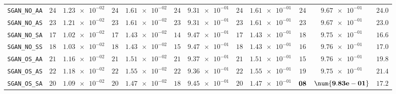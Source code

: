 \begin{xltabular}{\textwidth}{l||cC|cC|cC|cC|cC||c}
	\texttt{SGAN\_NO\_AA} & $ 24$ & $ \num{1.23e-02}$ & $ 24$ & $ \num{1.61e-02}$ & $ 24$ & $ \num{9.31e-01}$ & $ 24$ & $ \num{1.61e-01}$ & $ 24$ & $ \num{9.67e-01}$ & $ 24.0$  \\
	\texttt{SGAN\_NO\_AS} & $ 23$ & $ \num{1.21e-02}$ & $ 23$ & $ \num{1.61e-02}$ & $ 23$ & $ \num{9.31e-01}$ & $ 23$ & $ \num{1.61e-01}$ & $ 23$ & $ \num{9.67e-01}$ & $ 23.0$  \\
	\texttt{SGAN\_NO\_SA} & $ 17$ & $ \num{1.02e-02}$ & $ 17$ & $ \num{1.43e-02}$ & $ 14$ & $ \num{9.47e-01}$ & $ 17$ & $ \num{1.43e-01}$ & $ 18$ & $ \num{9.75e-01}$ & $ 16.6$  \\
	\texttt{SGAN\_NO\_SS} & $ 18$ & $ \num{1.03e-02}$ & $ 18$ & $ \num{1.43e-02}$ & $ 15$ & $ \num{9.47e-01}$ & $ 18$ & $ \num{1.43e-01}$ & $ 16$ & $ \num{9.76e-01}$ & $ 17.0$  \\
	\texttt{SGAN\_OS\_AA} & $ 21$ & $ \num{1.16e-02}$ & $ 21$ & $ \num{1.51e-02}$ & $ 21$ & $ \num{9.37e-01}$ & $ 21$ & $ \num{1.51e-01}$ & $ 15$ & $ \num{9.76e-01}$ & $ 19.8$  \\
	\texttt{SGAN\_OS\_AS} & $ 22$ & $ \num{1.18e-02}$ & $ 22$ & $ \num{1.55e-02}$ & $ 22$ & $ \num{9.36e-01}$ & $ 22$ & $ \num{1.55e-01}$ & $ 19$ & $ \num{9.75e-01}$ & $ 21.4$  \\
	\texttt{SGAN\_OS\_SA} & $ 20$ & $ \num{1.09e-02}$ & $ 20$ & $ \num{1.47e-02}$ & $ 18$ & $ \num{9.45e-01}$ & $ 20$ & $ \num{1.47e-01}$ & $\bf 08$ & $\bf \num{9.83e-01}$ & $ 17.2$  \\

\end{xltabular}
